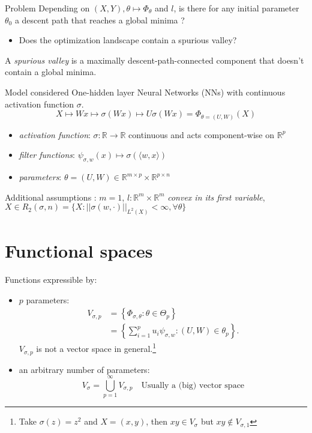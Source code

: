 \documentclass{beamer}
\begin{document}
\begin{frame}{Problem}
	Depending on $(X,Y), \theta \mapsto \Phi_\theta$ and $l$, is there for any initial parameter $\theta_0$ a descent path that reaches a global minima ?
	\begin{itemize}
		\item Does the optimization landscape contain a spurious valley?
	\end{itemize}
	\begin{definition}
		A \emph{spurious valley} is a maximally descent-path-connected component that doesn't contain a global minima.
	\end{definition}


\end{frame}

\begin{frame}{Model considered}
	One-hidden layer Neural Networks (NNs) with continuous activation function $\sigma$.
	\begin{equation*}
		X \mapsto Wx \mapsto \sigma(Wx) \mapsto U\sigma(Wx) = \Phi_{\theta = (U,W)}(X)
	\end{equation*}
	\begin{itemize}
		\item \emph{activation function}: $\sigma : \mathbb{R}\to\mathbb{R}$ continuous and acts component-wise on $\mathbb{R}^p$
		\item \emph{filter functions}: $\psi_{\sigma, w}(x) \mapsto \sigma(\langle w, x\rangle)$
		\item \emph{parameters}: $\theta = (U,W) \in \mathbb{R}^{m\times p}\times\mathbb{R}^{p\times n}$
	\end{itemize}
	Additional assumptions : $m=1$, $l:\mathbb{R}^m\times\mathbb{R}^m$ \emph{convex in its first variable}, $X\in R_2(\sigma, n) =\{X : ||\sigma(w, \cdot)||_{L^2(X)} < \infty, \forall \theta\}$
\end{frame}
\section{Functional spaces}
\begin{frame}
	Functions expressible by:
	\begin{itemize}
		\item  $p$ parameters:
			\begin{align*}
				V_{\sigma, p} 	&= \left\{ \Phi_{\sigma, \theta} : \theta \in \Theta_p \right\}\\
							&= \left\{ \sum_{i=1}^p u_i \psi_{\sigma, w} : (U, W)\in\theta_p \right\}.
			\end{align*}
		$V_{\sigma, p}$ is not a vector space in general.\footnote{Take $\sigma(z)=z^2$ and $X=(x,y)$, then $xy\in V_\sigma$ but $xy\notin V_{\sigma, 1}$}
		\item an arbitrary number of parameters:
			\begin{equation*}
				V_\sigma = \bigcup_{p=1}^\infty V_{\sigma, p} \quad \text{Usually a (big) vector space}
			\end{equation*}

	\end{itemize}
\end{frame}
\end{document}
